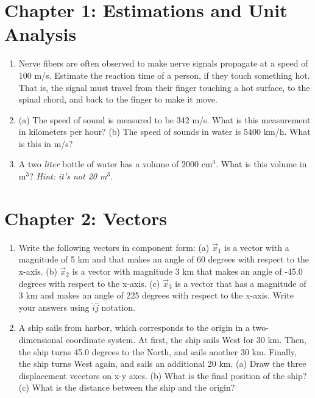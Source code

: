 \documentclass[10pt]{article}
\begin{document}
\section{Chapter 1: Estimations and Unit Analysis}

\begin{enumerate}
\item Nerve fibers are often observed to make nerve signals propagate at a speed of 100 m/s.  Estimate the reaction time of a person, if they touch something hot.  That is, the signal must travel from their finger touching a hot surface, to the spinal chord, and back to the finger to make it move. \\ \vspace{1.5cm}
\item (a) The speed of sound is measured to be 342 m/s. What is this measurement in kilometers per hour?  (b) The speed of sounds in water is 5400 km/h.  What is this in m/s? \\ \vspace{1cm}
\item A two \textit{liter} bottle of water has a volume of $2000$ cm$^3$.  What is this volume in m$^3$?  \textit{Hint: it's not 20 m$^3$.}\\ \vspace{1cm}
\end{enumerate}

\section{Chapter 2: Vectors}

\begin{enumerate}
\item Write the following vectors in component form: (a) $\vec{x}_1$ is a vector with a magnitude of 5 km and that makes an angle of 60 degrees with respect to the x-axis. (b) $\vec{x}_2$ is a vector with magnitude 3 km that makes an angle of -45.0 degrees with respect to the x-axis. (c) $\vec{x}_3$ is a vector that has a magnitude of 3 km and makes an angle of 225 degrees with respect to the x-axis.  Write your answers using $\hat{i} \hat{j}$ notation.  \\ \vspace{3cm}
\item A ship sails from harbor, which corresponds to the origin in a two-dimensional coordinate system.  At first, the ship sails West for 30 km.  Then, the ship turns 45.0 degrees to the North, and sails another 30 km.  Finally, the ship turns West again, and sails an additional 20 km.  (a) Draw the three displacement vecetors on x-y axes.  (b) What is the final position of the ship?  (c) What is the distance between the ship and the origin? \\ \vspace{3cm}
\end{enumerate}
\end{document}
